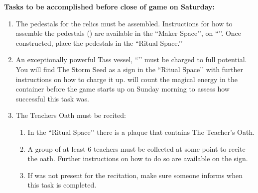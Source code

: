 \documentclass[green]{GL2020}
\begin{document}
\textbf{Tasks to be accomplished before close of game on Saturday:}
\begin{enumerate}
  \item The pedestals for the relics must be assembled. Instructions for how to assemble the pedestals (\iPedestalForRelic{}) are available in the ``Maker Space’’, on ``\sSignF{}’’. Once constructed, place the pedestals in the ``Ritual Space.’’
  \item An exceptionally powerful Tass vessel, ``\sStormSeed{}’’ must be charged to full potential. You will find The Storm Seed as a sign in the ``Ritual Space’’ with further instructions on how to charge it up. \cPrincipal{} will count the magical energy in the container before the game starts up on Sunday morning to assess how successful this task was.
  \item The Teachers Oath must be recited:
  \begin{enumerate}
    \item In the ``Ritual Space’’ there is a plaque that contains The Teacher’s Oath.
    \item A group of at least 6 teachers must be collected at some point to recite the oath. Further instructions on how to do so are available on the sign.
    \item If \cPrincipal{} was not present for the recitation, make sure someone informs \cPrincipal{\them} when this task is completed.
  \end{enumerate}
\end{enumerate}
\end{document}
